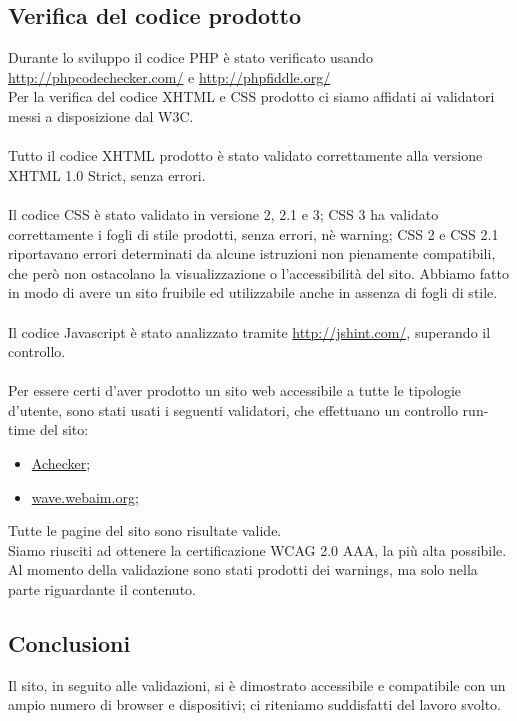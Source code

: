 {	\subsection{Verifica del codice prodotto}{
		Durante lo sviluppo il codice PHP è stato verificato  usando \url{http://phpcodechecker.com/} e \url{http://phpfiddle.org/}
		\\
		Per la verifica del codice XHTML e CSS prodotto ci siamo affidati ai validatori messi a disposizione dal W3C.\\
		\\
		Tutto il codice XHTML prodotto è stato validato correttamente alla versione XHTML 1.0 Strict, senza errori.\\
		\\
		Il codice CSS è stato validato in versione 2, 2.1 e 3; CSS 3 ha validato correttamente i fogli di stile prodotti, senza errori, nè warning; CSS 2 e CSS 2.1 riportavano errori determinati da alcune istruzioni non pienamente compatibili, che però non ostacolano la visualizzazione o l'accessibilità del sito. Abbiamo fatto in modo di avere un sito fruibile ed utilizzabile anche in assenza di fogli di stile.\\
		\\
		Il codice Javascript è stato analizzato tramite \url{http://jshint.com/}, superando il controllo.\\
		\\
		Per essere certi d'aver prodotto un sito web accessibile a tutte le tipologie d'utente, sono stati usati i seguenti validatori, che effettuano un controllo run-time del sito:
		\begin{itemize}\itemsep1pt
			\item \href{http://achecker.ca/checker/index.php}{Achecker};
			\item \href{http://wave.webaim.org/}{wave.webaim.org};
		\end{itemize}
		Tutte le pagine del sito sono risultate valide.\\
		Siamo riusciti ad ottenere la certificazione WCAG 2.0 AAA, la più alta possibile. Al momento della validazione sono stati prodotti dei warnings, ma solo nella parte riguardante il contenuto. 
	}
	
	\subsection{Conclusioni}
		Il sito, in seguito alle validazioni, si è dimostrato accessibile e compatibile con un ampio numero di browser e dispositivi; ci riteniamo suddisfatti del lavoro svolto.
}